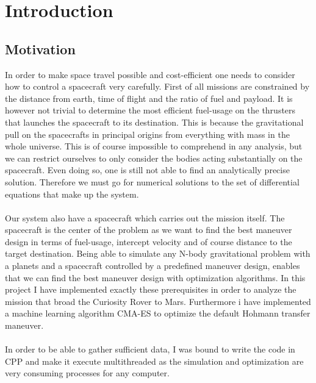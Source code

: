 
\chapter{Introduction}

\section{Motivation}
	In order to make space travel possible and cost-efficient one needs to consider how to control a spacecraft very carefully. First of all missions are constrained by the distance from earth, time of flight and the ratio of fuel and payload. It is however not trivial to determine the most efficient fuel-usage on the thrusters that launches the spacecraft to its destination. This is because the gravitational pull on the spacecrafts in principal origins from everything with mass in the whole universe. This is of course impossible to comprehend in any analysis, but we can restrict ourselves to only consider the bodies acting substantially on the spacecraft. Even doing so, one is still not able to find an analytically precise solution. Therefore we must go for numerical solutions to the set of differential equations that make up the system.
	\\ \\
	Our system also have a spacecraft which carries out the mission itself. The spacecraft is the center of the problem as we want to find the best maneuver design in terms of fuel-usage, intercept velocity and of course distance to the target destination.
	Being able to simulate any N-body gravitational problem with a planets and a spacecraft controlled by a predefined maneuver design, enables that we can find the best maneuver design with optimization algorithms.
	In this project I have implemented exactly these prerequisites in order to analyze the mission that broad the Curiosity Rover to Mars. Furthermore i have implemented a machine learning algorithm CMA-ES to optimize the default Hohmann transfer maneuver.
	\\ \\
	In order to be able to gather sufficient data, I was bound to write the code in CPP and make it execute multithreaded as the simulation and optimization are very consuming processes for any computer.  